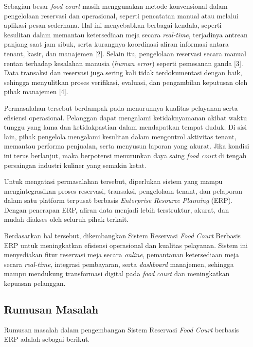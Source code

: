 \documentclass[conference]{IEEEtran}
\begin{document}
Sebagian besar \textit{food court} masih menggunakan metode konvensional dalam pengelolaan reservasi dan operasional, seperti pencatatan manual atau melalui aplikasi pesan sederhana. Hal ini menyebabkan berbagai kendala, seperti kesulitan dalam memantau ketersediaan meja secara \textit{real-time}, terjadinya antrean panjang saat jam sibuk, serta kurangnya koordinasi aliran informasi antara tenant, kasir, dan manajemen [2]. Selain itu, pengelolaan reservasi secara manual rentan terhadap kesalahan manusia (\textit{human error}) seperti pemesanan ganda [3]. Data transaksi dan reservasi juga sering kali tidak terdokumentasi dengan baik, sehingga menyulitkan proses verifikasi, evaluasi, dan pengambilan keputusan oleh pihak manajemen [4].

Permasalahan tersebut berdampak pada menurunnya kualitas pelayanan serta efisiensi operasional. Pelanggan dapat mengalami ketidaknyamanan akibat waktu tunggu yang lama dan ketidakpastian dalam mendapatkan tempat duduk. Di sisi lain, pihak pengelola mengalami kesulitan dalam mengontrol aktivitas tenant, memantau performa penjualan, serta menyusun laporan yang akurat. Jika kondisi ini terus berlanjut, maka berpotensi menurunkan daya saing \textit{food court} di tengah persaingan industri kuliner yang semakin ketat.

Untuk mengatasi permasalahan tersebut, diperlukan sistem yang mampu mengintegrasikan proses reservasi, transaksi, pengelolaan tenant, dan pelaporan dalam satu platform terpusat berbasis \textit{Enterprise Resource Planning} (ERP). Dengan penerapan ERP, aliran data menjadi lebih terstruktur, akurat, dan mudah diakses oleh seluruh pihak terkait.

Berdasarkan hal tersebut, dikembangkan Sistem Reservasi \textit{Food Court} Berbasis ERP untuk meningkatkan efisiensi operasional dan kualitas pelayanan. Sistem ini menyediakan fitur reservasi meja secara \textit{online}, pemantauan ketersediaan meja secara \textit{real-time}, integrasi pembayaran, serta \textit{dashboard} manajemen, sehingga mampu mendukung transformasi digital pada \textit{food court} dan meningkatkan kepuasan pelanggan.

\subsection{Rumusan Masalah}\label{AA}
Rumusan masalah dalam pengembangan Sistem Reservasi \textit{Food Court} berbasis ERP adalah sebagai berikut.
\end{document}
